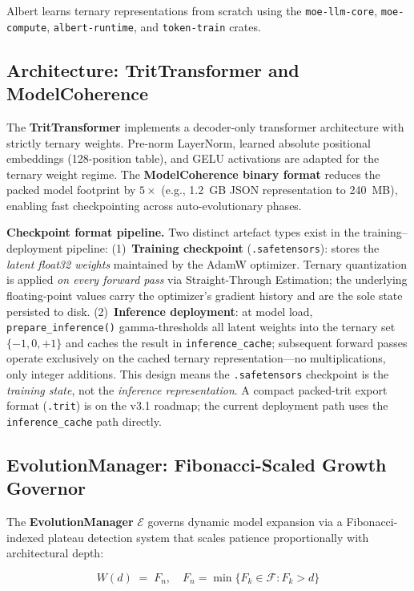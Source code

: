 \documentclass[journal,10pt,twocolumn]{IEEEtran}
\begin{document}
Albert learns
ternary representations from scratch using the \texttt{moe-llm-core},
\texttt{moe-compute}, \texttt{albert-runtime}, and \texttt{token-train}
crates.

\subsection{Architecture: TritTransformer and ModelCoherence}

The \textbf{TritTransformer} implements a decoder-only transformer
architecture with strictly ternary weights. Pre-norm LayerNorm, learned
absolute positional embeddings (128-position table), and GELU activations
are adapted for the ternary weight regime. The \textbf{ModelCoherence binary format} reduces the
packed model footprint by $5\times$ (e.g., 1.2~GB JSON representation to
240~MB), enabling fast checkpointing across auto-evolutionary phases.

\noindent\textbf{Checkpoint format pipeline.} Two distinct artefact types exist
in the training–deployment pipeline:
(1)~\textbf{Training checkpoint} (\texttt{.safetensors}): stores the
\emph{latent float32 weights} maintained by the AdamW optimizer.
Ternary quantization is applied \emph{on every forward pass} via Straight-Through
Estimation; the underlying floating-point values carry the optimizer's gradient
history and are the sole state persisted to disk.
(2)~\textbf{Inference deployment}: at model load, \texttt{prepare\_inference()}
gamma-thresholds all latent weights into the ternary set $\{-1,0,+1\}$ and
caches the result in \texttt{inference\_cache}; subsequent forward passes
operate exclusively on the cached ternary representation---no multiplications,
only integer additions.
This design means the \texttt{.safetensors} checkpoint is the \emph{training
state}, not the \emph{inference representation}.
A compact packed-trit export format (\texttt{.trit}) is on the v3.1 roadmap;
the current deployment path uses the \texttt{inference\_cache} path directly.

\subsection{EvolutionManager: Fibonacci-Scaled Growth Governor}
\label{subsec:evolution}

The \textbf{EvolutionManager} $\mathcal{E}$ governs dynamic model expansion
via a Fibonacci-indexed plateau detection system that scales patience
proportionally with architectural depth:

\begin{equation}
  W(d) \;=\; F_n, \quad F_n = \min\{F_k \in \mathcal{F} : F_k > d\}
  \label{eq:window}
\end{equation}
\end{document}
